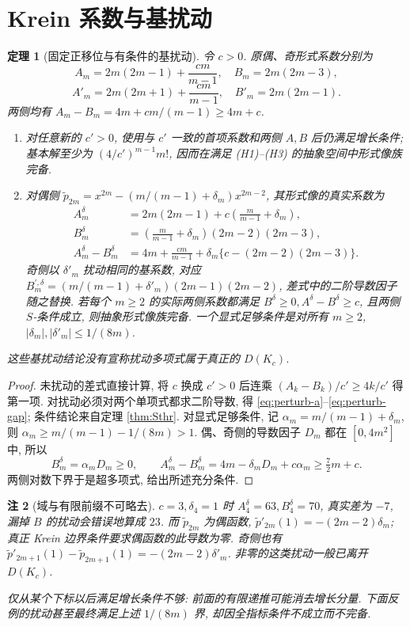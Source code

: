 \documentclass[UTF8]{ctexart}
\newtheorem{theorem}{定理}[section]
\newtheorem{remark}[theorem]{注}
\begin{document}
\section{Krein 系数与基扰动}

\begin{theorem}[固定正移位与有条件的基扰动]\label{thm:margin}
令 $c>0$. 原偶、奇形式系数分别为
\[
A_m=2m(2m-1)+\frac{cm}{m-1},\quad B_m=2m(2m-3),
\]
\[
A'_m=2m(2m+1)+\frac{cm}{m-1},\quad B'_m=2m(2m-1).
\]
两侧均有 $A_m-B_m=4m+cm/(m-1)\ge4m+c$.
\begin{enumerate}
\item 对任意新的 $c'>0$, 使用与 $c'$ 一致的首项系数和两侧
$A,B$ 后仍满足增长条件; 基本解至少为
$(4/c')^{m-1}m!$, 因而在满足 (H1)--(H3) 的抽象空间中形式像族完备.
\item 对偶侧
$\widetilde p_{2m}=x^{2m}-(m/(m-1)+\delta_m)x^{2m-2}$, 其形式像的真实系数为
\begin{align}
A_m^\delta&=2m(2m-1)+c\left(\frac m{m-1}+\delta_m\right),\label{eq:perturb-a}\\
B_m^\delta&=\left(\frac m{m-1}+\delta_m\right)(2m-2)(2m-3),\label{eq:perturb-b}\\
A_m^\delta-B_m^\delta
&=4m+\frac{cm}{m-1}+\delta_m\{c-(2m-2)(2m-3)\}.\label{eq:perturb-gap}
\end{align}
奇侧以 $\delta'_m$ 扰动相同的基系数, 对应
$B_m^{\prime,\delta}=(m/(m-1)+\delta'_m)(2m-1)(2m-2)$,
差式中的二阶导数因子随之替换.
若\emph{每个} $m\ge2$ 的实际两侧系数都满足
$B^\delta\ge0,A^\delta-B^\delta\ge c$, 且两侧 $S$-条件成立,
则抽象形式像族完备.
一个显式足够条件是对所有 $m\ge2$,
$|\delta_m|,|\delta'_m|\le1/(8m)$.
\end{enumerate}
这些基扰动结论没有宣称扰动多项式属于真正的 $D(K_c)$.
\end{theorem}
\begin{proof}
未扰动的差式直接计算, 将 $c$ 换成 $c'>0$ 后连乘
$(A_k-B_k)/c'\ge4k/c'$ 得第一项.
对扰动必须对两个单项式都求二阶导数, 得
\eqref{eq:perturb-a}--\eqref{eq:perturb-gap}; 条件结论来自定理 \ref{thm:Sthr}.
对显式足够条件, 记 $\alpha_m=m/(m-1)+\delta_m$,
则 $\alpha_m\ge m/(m-1)-1/(8m)>1$.
偶、奇侧的导数因子 $D_m$ 都在 $[0,4m^2]$ 中, 所以
\[
B_m^\delta=\alpha_mD_m\ge0,\qquad
A_m^\delta-B_m^\delta=4m-\delta_mD_m+c\alpha_m
\ge \tfrac72m+c .
\]
两侧对数下界于是超多项式, 给出所述充分条件.
\end{proof}

\begin{remark}[域与有限前缀不可略去]
$c=3,\delta_4=1$ 时 $A_4^\delta=63,B_4^\delta=70$,
真实差为 $-7$, 漏掉 $B$ 的扰动会错误地算成 $23$.
而 $\widetilde p_{2m}$ 为偶函数,
$\widetilde p'_{2m}(1)=-(2m-2)\delta_m$;
真正 Krein 边界条件要求偶函数的此导数为零.
奇侧也有
$\widetilde p'_{2m+1}(1)-\widetilde p_{2m+1}(1)=-(2m-2)\delta'_m$.
非零的这类扰动一般已离开 $D(K_c)$.

仅从某个下标以后满足增长条件不够: 前面的有限递推可能消去增长分量.
下面反例的扰动甚至最终满足上述 $1/(8m)$ 界,
却因全指标条件不成立而不完备.
\end{remark}
\end{document}
